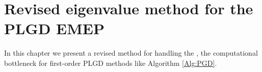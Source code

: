 \chapter{Revised eigenvalue method for the PLGD EMEP}			\label{Sec:Revised_method}

In this chapter we present a revised method for handling the \emep, the computational bottleneck for first-order PLGD methods like Algorithm \ref{Alg:PGD}.
